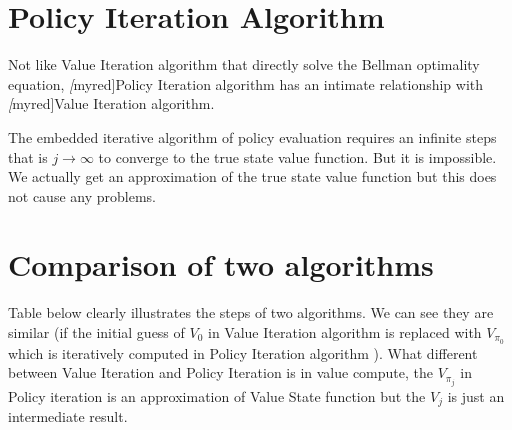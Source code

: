 \section{Policy Iteration Algorithm}
Not like Value Iteration algorithm that directly solve the Bellman optimality equation, \emph[myred]Policy Iteration algorithm has an intimate
relationship with \emph[myred]{Value Iteration algorithm}.\par
\begin{algorithm}
	\caption{Policy Iteration Algorithm}
\end{algorithm}
The embedded iterative algorithm of policy evaluation requires an infinite steps that is $j\to \infty$ to  converge to the true state value function. But it is impossible. We actually get an approximation of the true state value function but this does not cause any problems.

\section{Comparison of two algorithms}
Table below clearly illustrates the steps of two algorithms. We can see they are similar (if the initial guess of $V_{0}$ in Value Iteration
algorithm is replaced with $V_{\pi_{0}}$ which is iteratively computed in Policy Iteration algorithm ). What different between Value Iteration
and Policy Iteration is in value compute, the $V_{\pi_{j}}$ in Policy iteration is an approximation of Value State function but the $V_{j}$ is
just an intermediate result.

